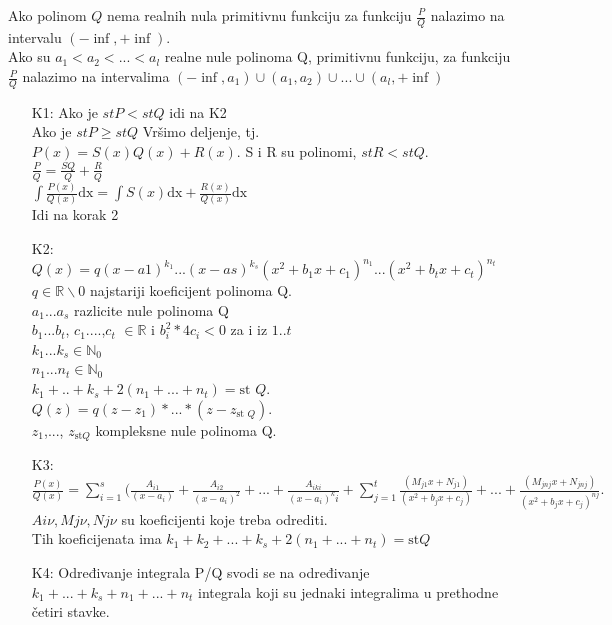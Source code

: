 \documentclass{article}
\begin{document}
Ako polinom $Q$ nema realnih nula primitivnu funkciju za funkciju $\frac{P}{Q}$ nalazimo na intervalu $(-\inf, +\inf)$.\\
Ako su $a_1 < a_2 < ... < a_l$ realne nule polinoma Q, primitivnu funkciju, za funkciju $\frac{P}{Q}$ nalazimo na intervalima $(-\inf, a_1)\cup(a_1, a_2)\cup...\cup(a_l,+\inf)$
\begin{enumerate}
    \item[K1:] Ako je $stP < stQ$ idi na K2\\
          Ako je $stP \geq stQ$ Vršimo deljenje, tj.\\
          $P(x) = S(x)Q(x) + R(x)$. S i R su polinomi, $st R < st Q$.\\
          $\frac{P}{Q} = \frac{SQ}{Q} + \frac{R}{Q}$\\
          $\int\frac{P(x)}{Q(x)}\text{dx} = \int S(x)\text{dx} + \frac{R(x)}{Q(x)}\text{dx}$\\
          Idi na korak 2
    \item[K2:] $Q(x) = q(x - a1)^{k_1}...(x-as)^{k_s}(x^2 + b_1x + c_1)^{n_1}...(x^2 + b_tx + c_t)^{n_t}$\\
          $q \in \mathbb{R}\backslash0$ najstariji koeficijent polinoma Q.\\
          $a_1$...$a_s$ razlicite nule polinoma Q\\
          $b_1$...$b_t$, $c_1$....,$c_t$ $\in \mathbb{R}$ i $b_i^2 * 4c_i < 0$ za i iz $1..t$\\
          $k_1$...$k_s \in \mathbb{N}_0$\\
          $n_1$...$n_t \in \mathbb{N}_0$\\
          $k_1+..+k_s+2(n_1+...+n_t) = \text{st }Q$.\\
          $Q(z) = q(z-z_1) *...*(z-z_{\text{st }Q})$.\\
          $z_1$,..., $z_{\text{st}Q}$ kompleksne nule polinoma Q.
    \item[K3:]  $\frac{P(x)}{Q(x)} = \sum_{i = 1}^s (\frac{A_{i1}}{(x-a_i)} + \frac{A_{i2}}{(x - a_i)^2} + ... + \frac{A_{iki}}{(x-a_i)^ki} + \sum_{j = 1}^t \frac{(M_{j1}x + N_{j1})}{(x^2 + b_jx + c_j)} + ... + \frac{(M_{jnj}x + N_{jnj})}{(x^2 + b_jx + c_j)^{nj}}.$\\
          $Ai\nu, Mj\nu, Nj\nu$ su koeficijenti koje treba odrediti.\\
          Tih koeficijenata ima $k_1 + k_2+...+k_s+ 2(n_1+...+n_t) = \text{st} Q$
    \item[K4:] Određivanje integrala P/Q svodi se na određivanje $k_1+...+k_s+n_1+...+n_t$ integrala koji su jednaki integralima u prethodne četiri stavke.
\end{enumerate}
\end{document}
